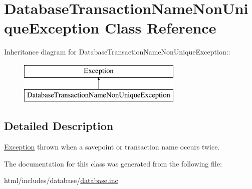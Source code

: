 \hypertarget{classDatabaseTransactionNameNonUniqueException}{
\section{DatabaseTransactionNameNonUniqueException Class Reference}
\label{classDatabaseTransactionNameNonUniqueException}
}
Inheritance diagram for DatabaseTransactionNameNonUniqueException::\begin{figure}[H]
\begin{center}
\leavevmode
\includegraphics[height=2cm]{classDatabaseTransactionNameNonUniqueException}
\end{center}
\end{figure}


\subsection{Detailed Description}
\hyperlink{classException}{Exception} thrown when a savepoint or transaction name occurs twice. 

The documentation for this class was generated from the following file:\begin{DoxyCompactItemize}
\item 
html/includes/database/\hyperlink{database_8inc}{database.inc}\end{DoxyCompactItemize}
